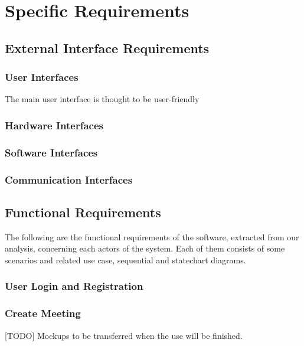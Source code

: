 \chapter{Specific Requirements}
\label{cha:requirements}

\section{External Interface Requirements}
\label{sec:ex_req}

\subsection{User Interfaces}
The main user interface is thought to be user-friendly 
\subsection{Hardware Interfaces}
\subsection{Software Interfaces}
\subsection{Communication Interfaces}

\section{Functional Requirements}
\label{sec:func_req}
The following are the functional requirements of the software, extracted from our analysis, concerning each actors of the system. Each of them consists of some scenarios and related use case, sequential and statechart diagrams.

\subsection*{User Login and Registration}


\subsection*{Create Meeting}


[TODO] Mockups to be transferred when the use will be finished.

